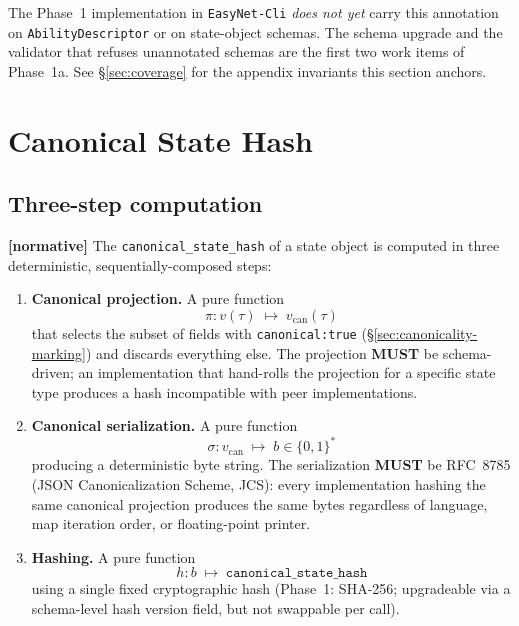 \documentclass[11pt,a4paper]{article}
\newcommand{\normsv}{\textcolor{normativecolor}{\textbf{[normative]}}\xspace}
\theoremstyle{definition}
\begin{document}
\begin{notebox}
The Phase~1 implementation in \texttt{EasyNet-Cli} \emph{does not
yet} carry this annotation on \texttt{AbilityDescriptor} or on
state-object schemas. The schema upgrade and the validator that
refuses unannotated schemas are the first two work items of
Phase~1a. See \S\ref{sec:coverage} for the appendix invariants
this section anchors.
\end{notebox}

\section{Canonical State Hash}
\label{sec:canonical-hash}

\subsection{Three-step computation}

\normsv{}
The \texttt{canonical\_state\_hash} of a state object is computed in
three deterministic, sequentially-composed steps:

\begin{enumerate}[leftmargin=2.5em]
    \item \textbf{Canonical projection.} A pure function
    \[
        \pi : v(\tau) \;\longmapsto\; v_{\text{can}}(\tau)
    \]
    that selects the subset of fields with
    \texttt{canonical:true} (\S\ref{sec:canonicality-marking}) and
    discards everything else. The projection \textbf{MUST} be
    schema-driven; an implementation that hand-rolls the
    projection for a specific state type produces a hash
    incompatible with peer implementations.

    \item \textbf{Canonical serialization.} A pure function
    \[
        \sigma : v_{\text{can}} \;\longmapsto\; b \in \{0,1\}^*
    \]
    producing a deterministic byte string. The serialization
    \textbf{MUST} be RFC~8785 (JSON Canonicalization Scheme,
    JCS): every implementation hashing the same canonical
    projection produces the same bytes regardless of language,
    map iteration order, or floating-point printer.

    \item \textbf{Hashing.} A pure function
    \[
        h : b \;\longmapsto\; \texttt{canonical\_state\_hash}
    \]
    using a single fixed cryptographic hash (Phase~1: SHA-256;
    upgradeable via a schema-level hash version field, but not
    swappable per call).
\end{enumerate}
\end{document}
